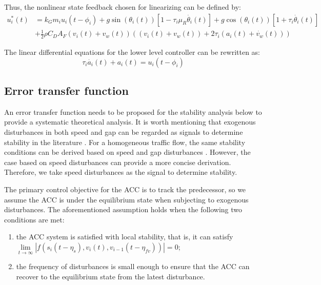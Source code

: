 \documentclass[a4paper]{cas-sc}
\begin{document}
Thus, the nonlinear state feedback chosen for linearizing can be defined by:
\begin{equation}
  \begin{aligned}
    u_i^\ast\left(t\right) & =k_Gm_iu_i\left(t-\phi_i\right)+g\sin{\left(\theta_i\left(t\right)\right)}\left[1-\tau_i\mu_R\dot{\theta_i}\left(t\right)\right]+g\cos{\left(\theta_i\left(t\right)\right)}\left[1+\tau_i\dot{\theta_i}\left(t\right)\right] \\
                           & +\frac{1}{2}\rho C_DA_F\left(v_i\left(t\right)+v_w\left(t\right)\right)\left(\left(v_i\left(t\right)+v_w\left(t\right)\right)+2\tau_i(a_i\left(t\right)+\dot{v_w}\left(t\right))\right)
  \end{aligned}
  \label{Eq18}
\end{equation}

The linear differential equations for the lower level controller can be rewritten as:
\begin{equation}
  \tau_i\dot{a_i}\left(t\right)+a_i\left(t\right)=u_i(t-\phi_i)
  \label{Eq19}
\end{equation}



\subsection{Error transfer function}
\label{Section 4.2}

An error transfer function needs to be proposed for the stability analysis below to provide a systematic theoretical analysis. It is worth mentioning that exogenous disturbances in both speed and gap can be regarded as signals to determine stability in the literature \citep{Feng2019,Qin2018,Navas2019,Jin2014}. For a homogeneous traffic flow, the same stability conditions can be derived based on speed and gap disturbances \citep{Montanino2021,Montanino2021a,Zheng2015}. However, the case based on speed disturbances can provide a more concise derivation. Therefore, we take speed disturbances as the signal to determine stability.

The primary control objective for the ACC is to track the predecessor, so we assume the ACC is under the equilibrium state when subjecting to exogenous disturbances. The aforementioned assumption holds when the following two conditions are met:
\begin{enumerate}
  \item the ACC system is satisfied with local stability, that is, it can satisfy $\mathop {\lim }\limits_{t \to \infty } \left| {f\left( {{s_i}\left( {t - {\eta _s}} \right),{v_i}(t),{v_{i - 1}}\left( {t - {\eta _{fv}}} \right)} \right)} \right| = 0$;
  \item the frequency of disturbances is small enough to ensure that the ACC can recover to the equilibrium state from the latest disturbance.
\end{enumerate}
\end{document}
